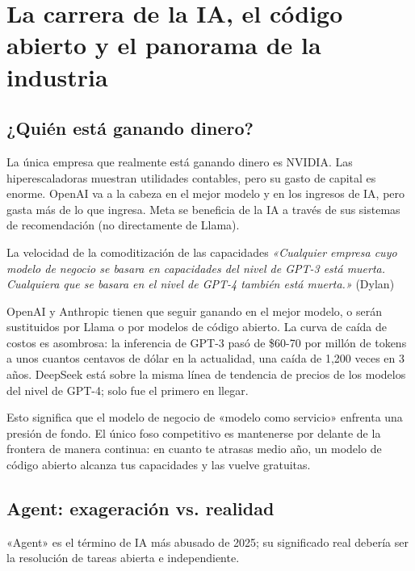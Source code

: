 \documentclass[a4paper]{article}
\begin{document}
\section{La carrera de la IA, el código abierto y el panorama de la industria}

\subsection{¿Quién está ganando dinero?}

La única empresa que realmente está ganando dinero es NVIDIA. Las hiperescaladoras muestran utilidades contables, pero su gasto de capital es enorme. OpenAI va a la cabeza en el mejor modelo y en los ingresos de IA, pero gasta más de lo que ingresa. Meta se beneficia de la IA a través de sus sistemas de recomendación (no directamente de Llama).

\begin{warningbox}{La velocidad de la comoditización de las capacidades}
\textit{«Cualquier empresa cuyo modelo de negocio se basara en capacidades del nivel de GPT-3 está muerta. Cualquiera que se basara en el nivel de GPT-4 también está muerta.»} (Dylan)

OpenAI y Anthropic tienen que seguir ganando en el mejor modelo, o serán sustituidos por Llama o por modelos de código abierto. La curva de caída de costos es asombrosa: la inferencia de GPT-3 pasó de \$60-70 por millón de tokens a unos cuantos centavos de dólar en la actualidad, una caída de 1,200 veces en 3 años. DeepSeek está sobre la misma línea de tendencia de precios de los modelos del nivel de GPT-4; solo fue el primero en llegar.

Esto significa que el modelo de negocio de «modelo como servicio» enfrenta una presión de fondo. El único foso competitivo es mantenerse por delante de la frontera de manera continua: en cuanto te atrasas medio año, un modelo de código abierto alcanza tus capacidades y las vuelve gratuitas.
\end{warningbox}

\subsection{Agent: exageración vs. realidad}

«Agent» es el término de IA más abusado de 2025; su significado real debería ser la resolución de tareas abierta e independiente.
\end{document}
